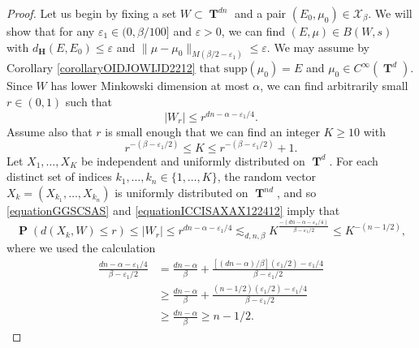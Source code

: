 \documentclass[12pt,reqno]{article}
\numberwithin{equation}{section}
\DeclareMathOperator{\TT}{\mathbf{T}}
\numberwithin{theorem}{section}
\DeclareMathOperator{\PP}{\mathbf{P}}
\begin{document}
\begin{proof}
    Let us begin by fixing a set $W \subset \TT^{dn}$ and a pair $(E_0,\mu_0) \in \mathcal{X}_\beta$. We will show that for any $\varepsilon_1 \in (0,\beta/100]$ and $\varepsilon > 0$, we can find $(E,\mu) \in B(W,s)$ with $d_\mathbf{H}(E,E_0) \leq \varepsilon$ and $\| \mu - \mu_0 \|_{M(\beta/2 - \varepsilon_1)} \leq \varepsilon$. We may assume by Corollary \ref{corollaryOIDJOWIJD2212} that $\text{supp}(\mu_0) = E$ and $\mu_0 \in C^\infty(\TT^d)$. Since $W$ has lower Minkowski dimension at most $\alpha$, we can find arbitrarily small $r \in (0,1)$ such that
    \begin{equation} \label{equationGGSCSAS}
        |W_r| \leq r^{dn - \alpha - \varepsilon_1/4}.
    \end{equation}
    Assume also that $r$ is small enough that we can find an integer $K \geq 10$ with
    \begin{equation} \label{equationICCISAXAX122412}
        r^{-(\beta - \varepsilon_1/2)} \leq K \leq r^{-(\beta - \varepsilon_1/2)} + 1.
    \end{equation}
    Let $X_1, \dots, X_K$ be independent and uniformly distributed on $\TT^d$. For each distinct set of indices $k_1, \dots, k_n \in \{ 1, \dots, K \}$, the random vector $X_k = (X_{k_1}, \dots, X_{k_n})$ is uniformly distributed on $\TT^{nd}$, and so \eqref{equationGGSCSAS} and \eqref{equationICCISAXAX122412} imply that
    \begin{equation} \label{equationGGASDCJWIJSFGGGG}
        \PP(d(X_k,W) \leq r) \leq |W_r| \leq r^{dn - \alpha - \varepsilon_1/4} \lesssim_{d,n,\beta} K^{\frac{-(dn - \alpha - \varepsilon_1/4)}{\beta - \varepsilon_1/2}} \leq K^{-(n-1/2)},
    \end{equation}
    where we used the calculation
    \begin{equation}
    \begin{split}
        \frac{dn - \alpha - \varepsilon_1/4}{\beta - \varepsilon_1/2} &= \frac{dn-\alpha}{\beta} + \frac{[(dn - \alpha)/\beta](\varepsilon_1/2) - \varepsilon_1/4}{\beta - \varepsilon_1/2}\\
        &\geq \frac{dn - \alpha}{\beta} + \frac{(n-1/2)(\varepsilon_1/2) - \varepsilon_1/4}{\beta - \varepsilon_1/2}\\
        &\geq \frac{dn - \alpha}{\beta} \geq n - 1/2.
    \end{split}
    \end{equation}

\end{proof}
\end{document}
